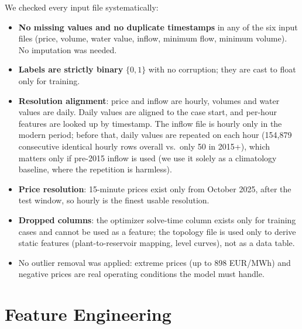 \documentclass{article}
\begin{document}
We checked every input file systematically:
\begin{itemize}
    \item \textbf{No missing values and no duplicate timestamps} in any
    of the six input files (price, volume, water value, inflow, minimum
    flow, minimum volume). No imputation was needed.
    \item \textbf{Labels are strictly binary} $\{0,1\}$ with no
    corruption; they are cast to float only for training.
    \item \textbf{Resolution alignment}: price and inflow are hourly,
    volumes and water values are daily. Daily values are aligned to the
    case start, and per-hour features are looked up by timestamp. The
    inflow file is hourly only in the modern period; before that, daily
    values are repeated on each hour (154{,}879 consecutive identical
    hourly rows overall vs.\ only 50 in 2015+), which matters only if
    pre-2015 inflow is used (we use it solely as a climatology baseline,
    where the repetition is harmless).
    \item \textbf{Price resolution}: 15-minute prices exist only from
    October 2025, after the test window, so hourly is the finest usable
    resolution.
    \item \textbf{Dropped columns}: the optimizer solve-time column
    exists only for training cases and cannot be used as a feature; the
    topology file is used only to derive static features
    (plant-to-reservoir mapping, level curves), not as a data table.
    \item No outlier removal was applied: extreme prices (up to 898
    EUR/MWh) and negative prices are real operating conditions the model
    must handle.
\end{itemize}

\section{Feature Engineering}
\label{sec:features}
\end{document}
